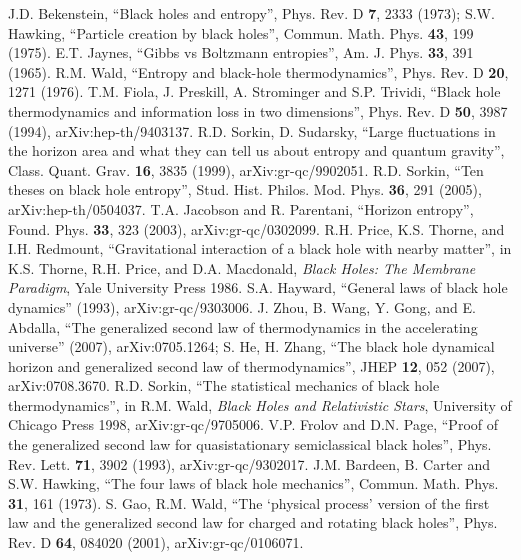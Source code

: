 \documentclass[12pt]{article}
\begin{document}
\begin{thebibliography}{99}

J.D. Bekenstein, ``Black holes and entropy'', Phys. Rev. D \textbf{7}, 2333 (1973); S.W. Hawking, ``Particle creation by black holes'', Commun. Math. Phys. \textbf{43}, 199 (1975).
E.T. Jaynes, ``Gibbs vs Boltzmann entropies'', Am. J. Phys. \textbf{33}, 391 (1965).
R.M. Wald, ``Entropy and black-hole thermodynamics'', Phys. Rev. D \textbf{20}, 1271 (1976).
T.M. Fiola, J. Preskill, A. Strominger and S.P. Trividi, ``Black hole thermodynamics and information loss in two dimensions'', Phys. Rev. D \textbf{50}, 3987 (1994), arXiv:hep-th/9403137.
R.D. Sorkin, D. Sudarsky, ``Large fluctuations in the horizon area and what they can tell us about entropy and quantum gravity'', Class. Quant. Grav. \textbf{16}, 3835 (1999), arXiv:gr-qc/9902051.
R.D. Sorkin, ``Ten theses on black hole entropy'', Stud. Hist. Philos. Mod. Phys. \textbf{36}, 291 (2005), arXiv:hep-th/0504037.
T.A. Jacobson and R. Parentani, ``Horizon entropy'', Found. Phys. \textbf{33}, 323 (2003), arXiv:gr-qc/0302099.
R.H. Price, K.S. Thorne, and I.H. Redmount, ``Gravitational interaction of a black hole with nearby matter'',
in K.S. Thorne, R.H. Price, and D.A. Macdonald, \textit{Black Holes: The Membrane Paradigm}, Yale University Press 1986.
S.A. Hayward, ``General laws of black hole dynamics'' (1993), arXiv:gr-qc/9303006.
J. Zhou, B. Wang, Y. Gong, and E. Abdalla, ``The generalized second law of thermodynamics in the accelerating universe'' (2007), arXiv:0705.1264; S. He, H. Zhang, ``The black hole dynamical horizon and generalized second law of thermodynamics'', JHEP \textbf{12}, 052 (2007), arXiv:0708.3670.
R.D. Sorkin, ``The statistical mechanics of black hole thermodynamics'', in R.M. Wald, \textit{Black Holes and Relativistic Stars}, University of Chicago Press 1998, arXiv:gr-qc/9705006.
V.P. Frolov and D.N. Page, ``Proof of the generalized second law for quasistationary semiclassical black holes'', Phys. Rev. Lett. \textbf{71}, 3902 (1993), arXiv:gr-qc/9302017.
J.M. Bardeen, B. Carter and S.W. Hawking, ``The four laws of black hole mechanics'', Commun. Math. Phys. \textbf{31}, 161 (1973).
S. Gao, R.M. Wald, ``The `physical process' version of the first law and the generalized second law for charged and rotating black holes'', Phys. Rev. D \textbf{64}, 084020 (2001), arXiv:gr-qc/0106071.

\end{thebibliography}
\end{document}
